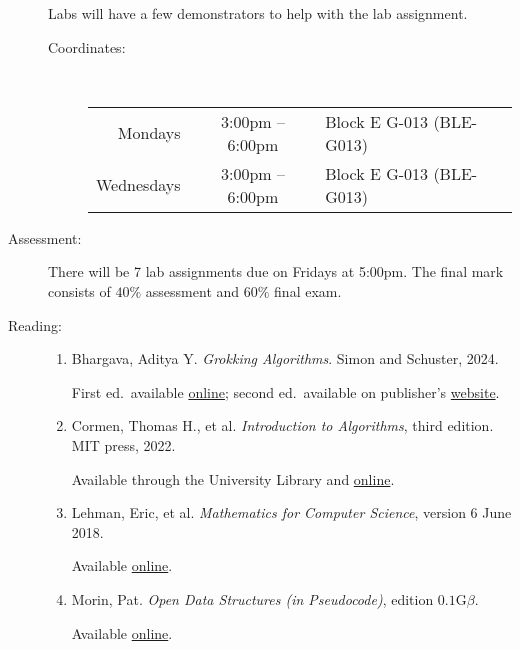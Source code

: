 \documentclass[a4paper, 12pt]{article}
\begin{document}
\begin{description}
    Labs will have a few demonstrators to help with the lab assignment. 
    \begin{description}
      \item[Coordinates:] \hfill \\[0.5em]
      \begin{tabular}{rcl}
        Mondays & 3:00pm -- 6:00pm & Block E G-013 (BLE-G013) \\ Wednesdays & 3:00pm -- 6:00pm & Block E G-013 (BLE-G013)
      \end{tabular}
    \end{description}
    \vspace{1cm}
    \item[Assessment:] There will be 7 lab assignments due on Fridays at 5:00pm. The final mark consists of $40\%$ assessment and $60\%$ final exam.
    \vspace{1cm}
    \item[Reading:] \hfill 
    \begin{enumerate}
      \item Bhargava, Aditya Y. \emph{Grokking Algorithms}. Simon and Schuster, 2024.
      
      First ed.\ available \href{https://edu.anarcho-copy.org/Algorithm/grokking-algorithms-illustrated-programmers-curious.pdf}{online}; second ed.\ available on publisher's \href{https://www.manning.com/books/grokking-algorithms}{website}.

      \item Cormen, Thomas H., et al. \emph{Introduction to Algorithms}, third edition. MIT press, 2022.
      
      Available through the University Library and \href{https://search.library.nuigalway.ie/permalink/f/1pmb9lf/353GAL_ALMA_DS2139494700003626}{online}.

      \item Lehman, Eric, et al. \emph{Mathematics for Computer Science}, version 6 June 2018. 
      
      Available \href{https://courses.csail.mit.edu/6.042/spring18/mcs.pdf}{online}.

      \item Morin, Pat. \emph{Open Data Structures (in Pseudocode)}, edition $0.1\text{G}\beta$.
      
      Available \href{https://opendatastructures.org/}{online}. 
    \end{enumerate}
\end{description}
\end{document}
